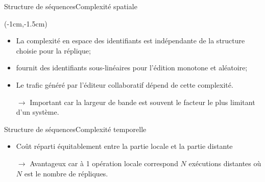 \begin{frame}{Structure de séquences}{Complexité spatiale}
  \vspace{1cm}
  
  \begin{textblock*}{\textwidth}(-1cm,-1.5cm) 
    \begin{table}[H]
      
    \end{table}
  \end{textblock*}
  
  \vspace{2cm}
  
  \begin{itemize}
  \item La complexité en espace des identifiants est indépendante de la
    structure choisie pour la réplique;
  \item \LSEQ fournit des identifiants sous-linéaires pour l'édition monotone
    et aléatoire;
  \item Le trafic généré par l'éditeur collaboratif dépend de cette complexité.
  \item [$\rightarrow$] Important car la largeur de bande est souvent le facteur
    le plus limitant d'un système.
  \end{itemize}
  
  
\end{frame}


\begin{frame}{Structure de séquences}{Complexité temporelle}

  \begin{center}
    
  \end{center}
  
  \vspace{0.5cm}
  
  \begin{itemize}
  \item Coût réparti équitablement entre la partie locale et la partie distante
  \item [$\rightarrow$] Avantageux car à 1 opération locale correspond $N$
    exécutions distantes où $N$ est le nombre de répliques.
  \end{itemize}
  
\end{frame}

